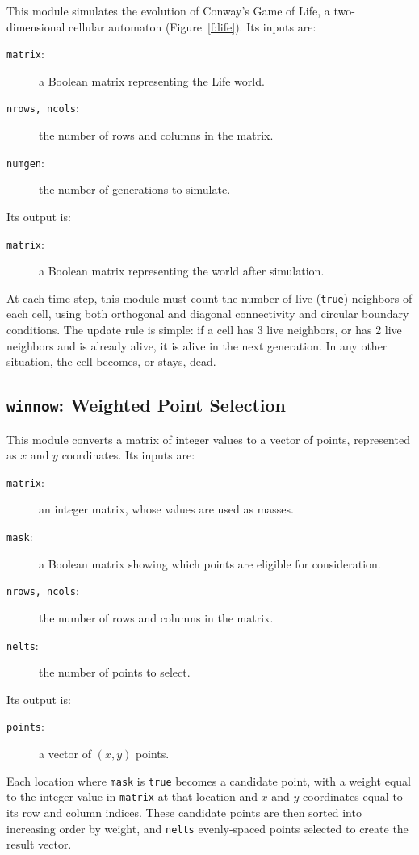 This module simulates the evolution of Conway's Game of Life,
a two-dimensional cellular automaton (Figure~\ref{f:life}).
Its inputs are:
\begin{description}
\item[{\tt{matrix}}:]
	a Boolean matrix representing the Life world.
\item[{\tt{nrows, ncols}}:]
	the number of rows and columns in the matrix.
\item[{\tt{numgen}}:]
	the number of generations to simulate.
\end{description}
Its output is:
\begin{description}
\item[{\tt{matrix}}:]
	a Boolean matrix representing the world after simulation.
\end{description}
At each time step,
this module must count the number of live ({\tt{true}}) neighbors
of each cell,
using both orthogonal and diagonal connectivity
and circular boundary conditions.
The update rule is simple:
if a cell has 3 live neighbors,
or has 2 live neighbors and is already alive,
it is alive in the next generation.
In any other situation,
the cell becomes, or stays, dead.

\subsection{{\tt{winnow}}:
	Weighted Point Selection
	\label{s:toys-winnow}}

This module converts a matrix of integer values
to a vector of points,
represented as $x$ and $y$ coordinates.
Its inputs are:
\begin{description}
\item[{\tt{matrix}}:]
	an integer matrix, whose values are used as masses.
\item[{\tt{mask}}:]
	a Boolean matrix showing which points are eligible for consideration.
\item[{\tt{nrows, ncols}}:]
	the number of rows and columns in the matrix.
\item[{\tt{nelts}}:]
	the number of points to select.
\end{description}
Its output is:
\begin{description}
\item[{\tt{points}}:]
	a vector of $(x,y)$ points.
\end{description}
Each location where {\tt{mask}} is {\tt{true}}
becomes a candidate point,
with a weight equal to the integer value in {\tt{matrix}} at that location
and $x$ and $y$ coordinates
equal to its row and column indices.
These candidate points are then sorted into increasing order by weight,
and {\tt{nelts}} evenly-spaced points selected to create the result vector.

